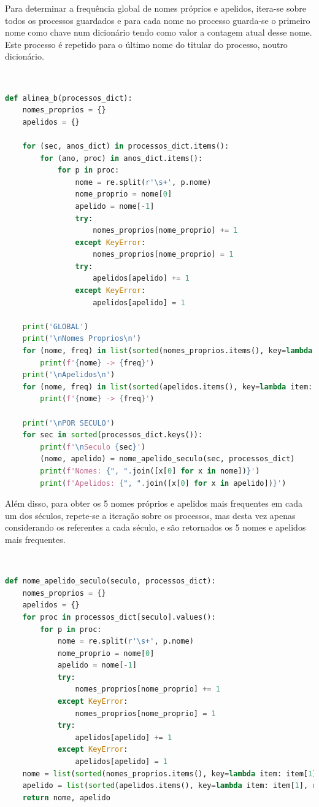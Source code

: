 \documentclass[a4paper, 11pt]{article}
\begin{document}
Para determinar a frequência global de nomes próprios e apelidos, itera-se sobre todos os processos
guardados e para cada nome no processo guarda-se o primeiro nome como chave num dicionário tendo como
valor a contagem atual desse nome. Este processo é repetido para o último nome do titular do processo,
noutro dicionário.

\

\begin{lstlisting}[language=Python]
def alinea_b(processos_dict):
    nomes_proprios = {}
    apelidos = {}

    for (sec, anos_dict) in processos_dict.items():
        for (ano, proc) in anos_dict.items():
            for p in proc:
                nome = re.split(r'\s+', p.nome)
                nome_proprio = nome[0]
                apelido = nome[-1]
                try:
                    nomes_proprios[nome_proprio] += 1
                except KeyError:
                    nomes_proprios[nome_proprio] = 1
                try:
                    apelidos[apelido] += 1
                except KeyError:
                    apelidos[apelido] = 1

    print('GLOBAL')
    print('\nNomes Proprios\n')
    for (nome, freq) in list(sorted(nomes_proprios.items(), key=lambda item: item[1], reverse=True)):
        print(f'{nome} -> {freq}')
    print('\nApelidos\n')
    for (nome, freq) in list(sorted(apelidos.items(), key=lambda item: item[1], reverse=True)):
        print(f'{nome} -> {freq}')

    print('\nPOR SECULO')
    for sec in sorted(processos_dict.keys()):
        print(f'\nSeculo {sec}')
        (nome, apelido) = nome_apelido_seculo(sec, processos_dict)
        print(f'Nomes: {", ".join([x[0] for x in nome])}')
        print(f'Apelidos: {", ".join([x[0] for x in apelido])}')
\end{lstlisting}

\pagebreak

Além disso, para obter os 5 nomes próprios e apelidos mais frequentes em cada um dos séculos, repete-se
a iteração sobre os processos, mas desta vez apenas considerando os referentes a cada século, e são
retornados os 5 nomes e apelidos mais frequentes.

\

\begin{lstlisting}[language=Python]
def nome_apelido_seculo(seculo, processos_dict):
    nomes_proprios = {}
    apelidos = {}
    for proc in processos_dict[seculo].values():
        for p in proc:
            nome = re.split(r'\s+', p.nome)
            nome_proprio = nome[0]
            apelido = nome[-1]
            try:
                nomes_proprios[nome_proprio] += 1
            except KeyError:
                nomes_proprios[nome_proprio] = 1
            try:
                apelidos[apelido] += 1
            except KeyError:
                apelidos[apelido] = 1
    nome = list(sorted(nomes_proprios.items(), key=lambda item: item[1], reverse=True))[:5]
    apelido = list(sorted(apelidos.items(), key=lambda item: item[1], reverse=True))[:5]
    return nome, apelido
\end{lstlisting}
\end{document}
